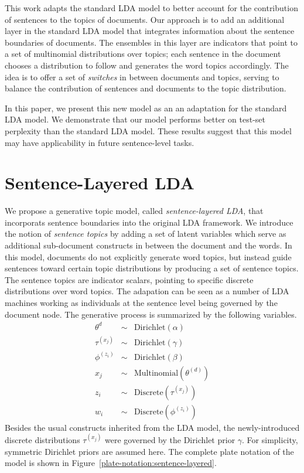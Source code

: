 This work adapts the standard LDA model to better account for the contribution
of sentences to the topics of documents.  Our approach is to add an additional
layer in the standard LDA model that integrates information about the sentence
boundaries of documents.  The ensembles in this layer are indicators that point
to a set of multinomial distributions over topics; each sentence in the
document chooses a distribution to follow and generates the word topics
accordingly.  The idea is to offer a set of \emph{switches} in between
documents and topics, serving to balance the contribution of sentences and
documents to the topic distribution.  

In this paper, we present this new model as an an adaptation for the standard
LDA model.  We demonstrate that our model performs better on test-set
perplexity than the standard LDA model.  These results suggest that this model
may have applicability in future sentence-level tasks.

\section{Sentence-Layered LDA} \label{s:sentence-layered-lda} 

We propose a generative topic model, called {\it sentence-layered LDA}, that
incorporats sentence boundaries into the original LDA framework.  We introduce
the notion of {\it sentence topics} by adding a set of latent variables which
serve as additional sub-document constructs in between the document and the
words.  In this model, documents do not explicitly generate word topics, but
instead guide sentences toward certain topic distributions by producing a set
of sentence topics.  The sentence topics are indicator scalars, pointing to
specific discrete distributions over word topics.  The adapation can be seen as
a number of LDA machines working as individuals at the sentence level being
governed by the document node.  The generative process is summarized by the
following variables.  
\begin{eqnarray*}
  \theta^{d} &\sim& \mathrm{Dirichlet}(\alpha) \\
  \tau^{(x_j)} &\sim& \mathrm{Dirichlet}(\gamma) \\
  \phi^{(z_i)} &\sim& \mathrm{Dirichlet}(\beta) \\
  x_j &\sim& \mathrm{Multinomial}(\theta^{(d)}) \\
  z_i &\sim& \mathrm{Discrete}(\tau^{(x_j)}) \\
  w_i &\sim& \mathrm{Discrete}(\phi^{(z_i)})
\end{eqnarray*}
Besides the usual constructs inherited from the LDA model, the newly-introduced
discrete distributions $\tau^{(x_j)}$ were governed by the Dirichlet prior
$\gamma$.   For simplicity, symmetric Dirichlet priors are assumed here.  The
complete plate notation of the model is shown in
Figure~\ref{plate-notation:sentence-layered}.


